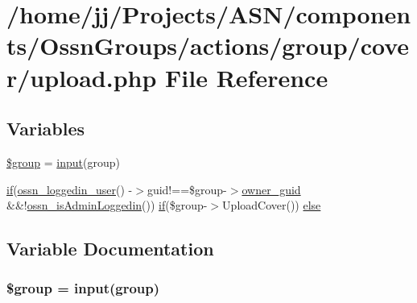 \hypertarget{_ossn_groups_2actions_2group_2cover_2upload_8php}{}\section{/home/jj/\+Projects/\+A\+S\+N/components/\+Ossn\+Groups/actions/group/cover/upload.php File Reference}
\label{_ossn_groups_2actions_2group_2cover_2upload_8php}
\subsection*{Variables}
\begin{DoxyCompactItemize}
\item 
\hyperlink{_ossn_groups_2actions_2group_2cover_2upload_8php_ad530a85733b0ec1dc321859fd8faa0dc}{\$group} = \hyperlink{ossn_8lib_8input_8php_a64ebee98b041c4f75f71ed3cd73cc8ed}{input}(\textquotesingle{}group\textquotesingle{})
\item 
\hyperlink{jquery_8tokeninput_8js_ad8dd46a3cbc004569e34401e9e71771a}{if}(\hyperlink{ossn_8lib_8users_8php_aa3c8068d0e6638b414d6a2f6c62565b8}{ossn\+\_\+loggedin\+\_\+user}() -\/$>$guid!==\$group-\/$>$\hyperlink{user_8php_a307051fefc937afd02c509c55646f50b}{owner\+\_\+guid} \&\&!\hyperlink{ossn_8lib_8users_8php_abf45a4c659ffd196160e8173c2af1106}{ossn\+\_\+is\+Admin\+Loggedin}()) \hyperlink{jquery_8tokeninput_8js_ad8dd46a3cbc004569e34401e9e71771a}{if}(\$group-\/$>$Upload\+Cover()) \hyperlink{_ossn_groups_2actions_2group_2cover_2upload_8php_ae343b4529d755a3e4da1699b20471137}{else}
\end{DoxyCompactItemize}


\subsection{Variable Documentation}
\subsubsection[{\texorpdfstring{\$group}{$group}}]{\setlength{\rightskip}{0pt plus 5cm}\$group = {\bf input}(\textquotesingle{}group\textquotesingle{})}\hypertarget{_ossn_groups_2actions_2group_2cover_2upload_8php_ad530a85733b0ec1dc321859fd8faa0dc}{}\label{_ossn_groups_2actions_2group_2cover_2upload_8php_ad530a85733b0ec1dc321859fd8faa0dc}


